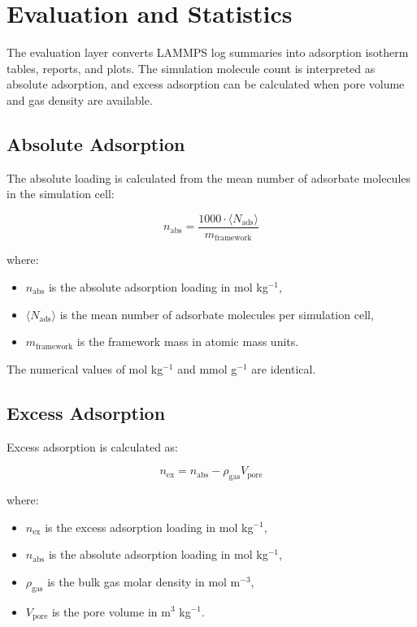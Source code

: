 \section{Evaluation and Statistics}

The evaluation layer converts LAMMPS log summaries into adsorption isotherm tables, reports, and plots.
The simulation molecule count is interpreted as absolute adsorption, and excess adsorption can be calculated when pore volume and gas density are available.

\subsection{Absolute Adsorption}

The absolute loading is calculated from the mean number of adsorbate molecules in the simulation cell:

\begin{equation}
    n_{\mathrm{abs}} =
    \frac{1000 \cdot \langle N_{\mathrm{ads}}\rangle}{m_{\mathrm{framework}}}
\end{equation}

where:

\begin{itemize}
    \item $n_{\mathrm{abs}}$ is the absolute adsorption loading in mol kg$^{-1}$,
    \item $\langle N_{\mathrm{ads}}\rangle$ is the mean number of adsorbate molecules per simulation cell,
    \item $m_{\mathrm{framework}}$ is the framework mass in atomic mass units.
\end{itemize}

The numerical values of mol kg$^{-1}$ and mmol g$^{-1}$ are identical.

\subsection{Excess Adsorption}

Excess adsorption is calculated as:

\begin{equation}
    n_{\mathrm{ex}} =
    n_{\mathrm{abs}} - \rho_{\mathrm{gas}} V_{\mathrm{pore}}
\end{equation}

where:

\begin{itemize}
    \item $n_{\mathrm{ex}}$ is the excess adsorption loading in mol kg$^{-1}$,
    \item $n_{\mathrm{abs}}$ is the absolute adsorption loading in mol kg$^{-1}$,
    \item $\rho_{\mathrm{gas}}$ is the bulk gas molar density in mol m$^{-3}$,
    \item $V_{\mathrm{pore}}$ is the pore volume in m$^3$ kg$^{-1}$.
\end{itemize}

